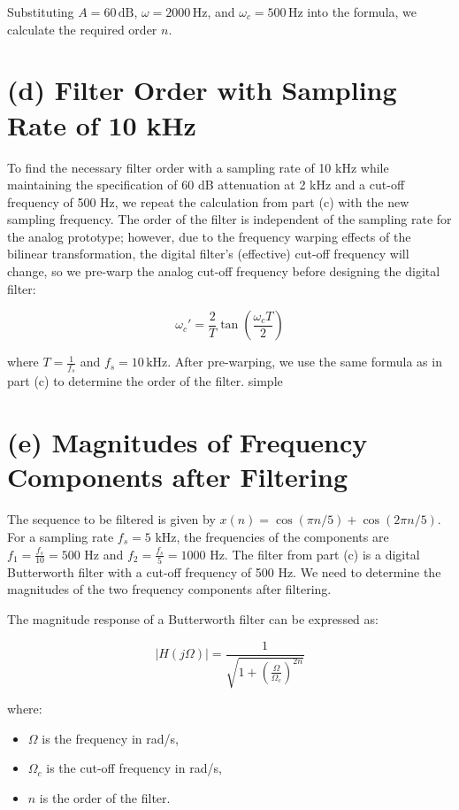 \documentclass{article}
\begin{document}
Substituting $A = 60 \, \text{dB}$, $\omega = 2000 \, \text{Hz}$, and $\omega_c = 500 \, \text{Hz}$ into the formula, we calculate the required order $n$.

\section*{(d) Filter Order with Sampling Rate of 10 kHz}

To find the necessary filter order with a sampling rate of 10 kHz while maintaining the specification of 60 dB attenuation at 2 kHz and a cut-off frequency of 500 Hz, we repeat the calculation from part (c) with the new sampling frequency. The order of the filter is independent of the sampling rate for the analog prototype; however, due to the frequency warping effects of the bilinear transformation, the digital filter's (effective) cut-off frequency will change, so we pre-warp the analog cut-off frequency before designing the digital filter:

\[ \omega_c' = \frac{2}{T} \tan\left(\frac{\omega_c T}{2}\right) \]

where $T = \frac{1}{f_s}$ and $f_s = 10 \, \text{kHz}$. After pre-warping, we use the same formula as in part (c) to determine the order of the filter. simple

\section*{(e) Magnitudes of Frequency Components after Filtering}

The sequence to be filtered is given by $x(n) = \cos(\pi n / 5) + \cos(2\pi n / 5)$. For a sampling rate $f_s = 5$ kHz, the frequencies of the components are $f_1 = \frac{f_s}{10} = 500$ Hz and $f_2 = \frac{f_s}{5} = 1000$ Hz. The filter from part (c) is a digital Butterworth filter with a cut-off frequency of 500 Hz. We need to determine the magnitudes of the two frequency components after filtering.

The magnitude response of a Butterworth filter can be expressed as:

\[
|H(j\Omega)| = \frac{1}{\sqrt{1 + \left(\frac{\Omega}{\Omega_c}\right)^{2n}}}
\]

where:
\begin{itemize}
    \item $\Omega$ is the frequency in rad/s,
    \item $\Omega_c$ is the cut-off frequency in rad/s,
    \item $n$ is the order of the filter.
\end{itemize}
\end{document}
